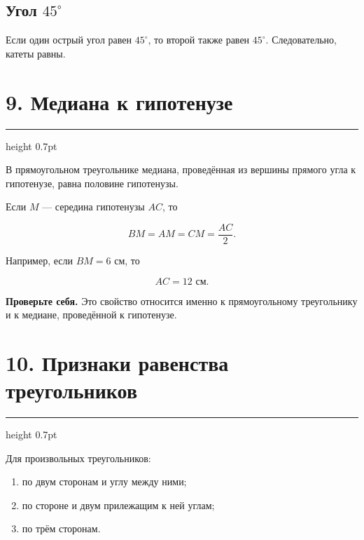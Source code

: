 \documentclass[a4paper,12pt]{article}
\newcommand{\sectionline}{%
    \vspace{-0.15em}
    {\color{accent}\hrule height 0.7pt}
    \vspace{0.55em}
}
\newcommand{\warning}[1]{%
    \par\noindent
    {\color{darkaccent}\textbf{Проверьте себя.}} #1\par
}
\newcommand{\formula}[1]{%
    \[
        \boxed{\displaystyle #1}
    \]
}
\begin{document}
\subsection*{Угол $45^\circ$}

Если один острый угол равен $45^\circ$, то второй также равен $45^\circ$.
Следовательно, катеты равны.

\section*{\color{darkaccent}9. Медиана к гипотенузе}
\sectionline

В прямоугольном треугольнике медиана, проведённая из вершины прямого угла к
гипотенузе, равна половине гипотенузы.

\begin{center}
\end{center}

Если $M$ --- середина гипотенузы $AC$, то

\formula{BM=AM=CM=\frac{AC}{2}.}

Например, если $BM=6$ см, то

\[
AC=12\text{ см}.
\]

\warning{Это свойство относится именно к прямоугольному треугольнику и к
медиане, проведённой к гипотенузе.}

\section*{\color{darkaccent}10. Признаки равенства треугольников}
\sectionline

Для произвольных треугольников:

\begin{enumerate}
    \item по двум сторонам и углу между ними;
    \item по стороне и двум прилежащим к ней углам;
    \item по трём сторонам.
\end{enumerate}
\end{document}
